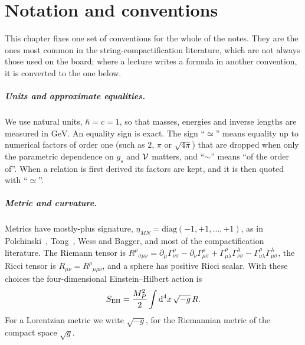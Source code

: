 \chapter*{Notation and conventions}

This chapter fixes one set of conventions for the whole of the notes. They are the ones most common in the string-compactification literature, which are not always those used on the board; where a lecture writes a formula in another convention, it is converted to the one below.

\paragraph{Units and approximate equalities.} We use natural units, $\hbar = c = 1$, so that masses, energies and inverse lengths are measured in $\mathrm{GeV}$. An equality sign is exact. The sign ``$\simeq$'' means equality up to numerical factors of order one (such as $2$, $\pi$ or $\sqrt{4\pi}$) that are dropped when only the parametric dependence on $g_s$ and $\mathcal{V}$ matters, and ``$\sim$'' means ``of the order of''. When a relation is first derived its factors are kept, and it is then quoted with ``$\simeq$''.

\paragraph{Metric and curvature.} Metrics have mostly-plus signature, $\eta_{MN} = \mathrm{diag}(-1,+1,\dots,+1)$, as in Polchinski~\cite{Polchinski}, Tong~\cite{Tong}, Wess and Bagger, and most of the compactification literature. The Riemann tensor is $R^\rho{}_{\sigma\mu\nu} = \partial_\mu\Gamma^\rho_{\nu\sigma} - \partial_\nu\Gamma^\rho_{\mu\sigma} + \Gamma^\rho_{\mu\lambda}\Gamma^\lambda_{\nu\sigma} - \Gamma^\rho_{\nu\lambda}\Gamma^\lambda_{\mu\sigma}$, the Ricci tensor is $R_{\mu\nu} = R^\rho{}_{\mu\rho\nu}$, and a sphere has positive Ricci scalar. With these choices the four-dimensional Einstein--Hilbert action is
\begin{equation*}
  S_{\mathrm{EH}} = \frac{M_{P}^2}{2}\int\mathrm{d}^4x\,\sqrt{-g}\,R .
\end{equation*}
For a Lorentzian metric we write $\sqrt{-g}$, for the Riemannian metric of the compact space $\sqrt{g}$.


